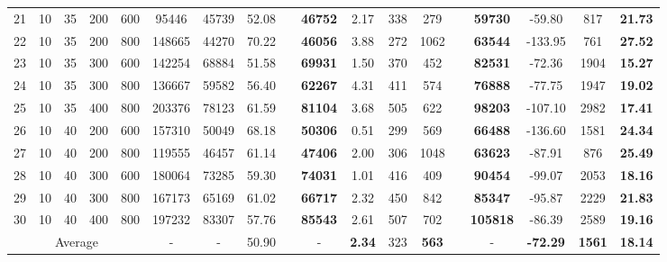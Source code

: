 \documentclass[11pt,nonblindrev,fleqn]{article}
\begin{document}
\begin{table}[H]
\begin{tabular}{cccccccccccccccccc}
21    & 10    & 35    & 200   & 600   & 95446 & 45739 & 52.08  &       & \textbf{46752 } & 2.17  & 338   & 279   &       & \textbf{59730} & -59.80  & 817   & \textbf{21.73 } \\
22    & 10    & 35    & 200   & 800   & 148665 & 44270 & 70.22  &       & \textbf{46056 } & 3.88  & 272   & 1062  &       & \textbf{63544} & -133.95  & 761   & \textbf{27.52 } \\
23    & 10    & 35    & 300   & 600   & 142254 & 68884 & 51.58  &       & \textbf{69931 } & 1.50  & 370   & 452   &       & \textbf{82531} & -72.36  & 1904  & \textbf{15.27 } \\
24    & 10    & 35    & 300   & 800   & 136667 & 59582 & 56.40  &       & \textbf{62267 } & 4.31  & 411   & 574   &       & \textbf{76888} & -77.75  & 1947  & \textbf{19.02 } \\
25    & 10    & 35    & 400   & 800   & 203376 & 78123 & 61.59  &       & \textbf{81104 } & 3.68  & 505   & 622   &       & \textbf{98203} & -107.10  & 2982  & \textbf{17.41 } \\
26    & 10    & 40    & 200   & 600   & 157310 & 50049 & 68.18  &       & \textbf{50306 } & 0.51  & 299   & 569 &       & \textbf{66488} & -136.60  & 1581  & \textbf{24.34 } \\
27    & 10    & 40    & 200   & 800   & 119555 & 46457 & 61.14  &       & \textbf{47406 } & 2.00  & 306   & 1048  &       & \textbf{63623} & -87.91  & 876   & \textbf{25.49 } \\
28    & 10    & 40    & 300   & 600   & 180064 & 73285 & 59.30  &       & \textbf{74031 } & 1.01  & 416   & 409   &       & \textbf{90454} & -99.07  & 2053  & \textbf{18.16 } \\
29    & 10    & 40    & 300   & 800   & 167173 & 65169 & 61.02  &       & \textbf{66717 } & 2.32  & 450   & 842   &       & \textbf{85347} & -95.87  & 2229  & \textbf{21.83 } \\
30    & 10    & 40    & 400   & 800   & 197232 & 83307 & 57.76  &       & \textbf{85543 } & 2.61  & 507   & 702   &       & \textbf{105818} & -86.39  & 2589  & \textbf{19.16 } \\
\multicolumn{5}{c}{Average}           &    -  & -     & 50.90  &       & -     & \textbf{2.34 } & 323   & \textbf{563} &       & -     & \textbf{-72.29 } & \textbf{1561} & \textbf{18.14 } \bigstrut[b]\\
\hline
\end{tabular}%

\end{table}%
\end{document}
